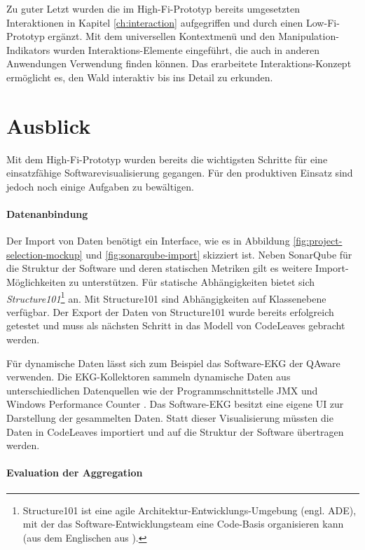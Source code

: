Zu guter Letzt wurden die im High-Fi-Prototyp bereits umgesetzten Interaktionen in Kapitel \ref{ch:interaction} aufgegriffen und durch einen Low-Fi-Prototyp ergänzt. Mit dem universellen Kontextmenü und den Manipulation-Indikators wurden Interaktions-Elemente eingeführt, die auch in anderen Anwendungen Verwendung finden können. Das erarbeitete Interaktions-Konzept ermöglicht es, den Wald interaktiv bis ins Detail zu erkunden.

\section{Ausblick}

Mit dem High-Fi-Prototyp wurden bereits die wichtigsten Schritte für eine einsatzfähige Softwarevisualisierung gegangen. Für den produktiven Einsatz sind jedoch noch einige Aufgaben zu bewältigen.

\paragraph{Datenanbindung}

Der Import von Daten benötigt ein Interface, wie es in Abbildung \ref{fig:project-selection-mockup} und \ref{fig:sonarqube-import} skizziert ist. Neben SonarQube für die Struktur der Software und deren statischen Metriken gilt es weitere Import-Möglichkeiten zu unterstützen. Für statische Abhängigkeiten bietet sich \textit{Structure101}\footnote{Structure101 ist eine agile Architektur-Entwicklungs-Umgebung (engl. ADE), mit der das Software-Entwicklungsteam eine Code-Basis organisieren kann (aus dem Englischen aus \cite{headway2017structure101}).} an. Mit Structure101 sind Abhängigkeiten auf Klassenebene verfügbar. Der Export der Daten von Structure101 wurde bereits erfolgreich getestet und muss als nächsten Schritt in das Modell von CodeLeaves gebracht werden.

Für dynamische Daten lässt sich zum Beispiel das Software-EKG der QAware verwenden. Die EKG-Kollektoren sammeln dynamische Daten aus unterschiedlichen Datenquellen wie der Programmschnittstelle JMX und Windows Performance Counter \cite{weigend2011dynamische}. Das Software-EKG besitzt eine eigene UI zur Darstellung der gesammelten Daten. Statt dieser Visualisierung müssten die Daten in CodeLeaves importiert und auf die Struktur der Software übertragen werden.

\paragraph{Evaluation der Aggregation}

